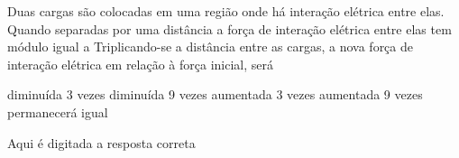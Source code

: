 \question [20] Duas cargas são colocadas em uma região onde há interação elétrica entre elas. Quando separadas por uma distância   a força de interação elétrica entre elas tem módulo igual a   Triplicando-se a distância entre as cargas, a nova força de interação elétrica em relação à força inicial, será


		\begin{EnvUplevel}
			\begin{choices}
			
			\choice diminuída 3 vezes   
			\correctchoice diminuída 9 vezes    
			\choice aumentada 3 vezes      
			\choice aumentada 9 vezes     
			\choice permanecerá igual 
				
			\end{choices}
		\end{EnvUplevel}
		
		\begin{EnvUplevel}
		\begin{solution}
		
		Aqui é digitada a resposta correta
		
		\end{solution}
		\end{EnvUplevel}


	
